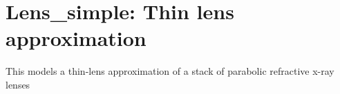 \section{Lens\_simple: Thin lens approximation}


This models a thin-lens approximation of a stack of parabolic refractive x-ray lenses
